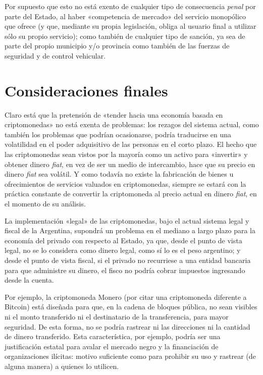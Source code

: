\documentclass[12pt,a4paper,twoside]{book}
\begin{document}
\begin{enumerate}
\end{enumerate}

Por supuesto que esto no está exento de cualquier tipo de consecuencia \textit{penal} por parte del Estado, al haber «competencia de mercado» del servicio monopólico que ofrece (y que, mediante su propia legislación, obliga al usuario final a utilizar sólo su propio servicio); como también de cualquier tipo de sanción, ya sea de parte del propio municipio y/o provincia como también de las fuerzas de seguridad y de control vehicular.

\section{Consideraciones finales}
Claro está que la pretensión de «tender hacia una economía basada en criptomonedas» no está exenta de problemas: los rezagos del sistema actual, como también los problemas que podrían ocasionarse, podría traducirse en una volatilidad en el poder adquisitivo de las personas en el corto plazo. El hecho que las criptomonedas sean vistos por la mayoría como un activo para «invertir» y obtener dinero \textit{fiat}, en vez de ser un medio de intercambio, hace que su precio en dinero \textit{fiat} sea volátil. Y como todavía no existe la fabricación de bienes u ofrecimientos de servicios valuados en criptomonedas, siempre se estará con la práctica constante de convertir la criptomoneda al precio actual en dinero \textit{fiat}, en el momento de su análisis.

La implementación «legal» de las criptomonedas, bajo el actual sistema legal y fiscal de la Argentina, supondrá un problema en el mediano a largo plazo para la economía del privado con respecto al Estado, ya que, desde el punto de vista legal, no se lo considera como dinero legal, como sí lo es el peso argentino; y desde el punto de vista fiscal, si el privado no recurriese a una entidad bancaria para que administre su dinero, el fisco no podría cobrar impuestos ingresando desde la cuenta.

Por ejemplo, la criptomoneda Monero (por citar una criptomoneda diferente a Bitcoin) está diseñada para que, en la cadena de bloques pública, no sean visibles ni el monto transferido ni el destinatario de la transferencia, para mayor seguridad. De esta forma, no se podría rastrear ni las direcciones ni la cantidad de dinero transferido. Esta característica, por ejemplo, podría ser una justificación estatal para avalar el mercado negro y la financiación de organizaciones ilícitas: motivo suficiente como para prohibir su uso y rastrear (de alguna manera) a quienes lo utilicen. 
\end{document}
